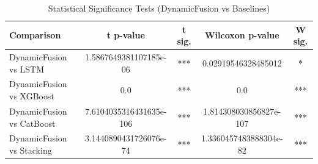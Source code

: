 \begin{table}[htbp]
\centering
\caption{Statistical Significance Tests (DynamicFusion vs Baselines)}
\label{tab:significance}
\begin{tabular}{lcccc}
\hline
Comparison & t p-value & t sig. & Wilcoxon p-value & W sig. \\
\hline
DynamicFusion vs LSTM & 1.5867649381107185e-06 & *** & 0.02919546328485012 & * \\
DynamicFusion vs XGBoost & 0.0 & *** & 0.0 & *** \\
DynamicFusion vs CatBoost & 7.6104035316431635e-106 & *** & 1.814308030856827e-107 & *** \\
DynamicFusion vs Stacking & 3.1440890431726076e-74 & *** & 1.3360457483888304e-82 & *** \\
\hline
\end{tabular}
\end{table}
